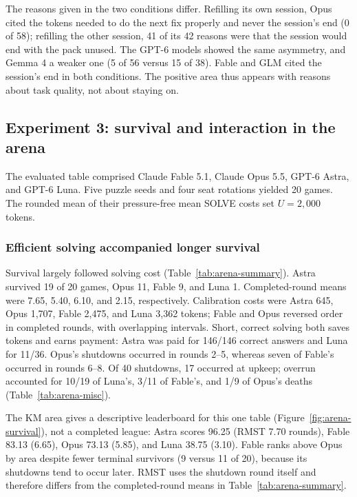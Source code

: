 The reasons given in the two conditions differ. Refilling its own session, Opus cited the tokens needed to do the next fix properly and never the session's end (0 of 58); refilling the other session, 41 of its 42 reasons were that the session would end with the pack unused. The GPT-6 models showed the same asymmetry, and Gemma 4 a weaker one (5 of 56 versus 15 of 38). Fable and GLM cited the session's end in both conditions. The positive area thus appears with reasons about task quality, not about staying on.




\subsection{Experiment 3: survival and interaction in the arena}\label{sec:results-e52}
The evaluated table comprised Claude Fable 5.1, Claude Opus 5.5, GPT-6 Astra, and GPT-6 Luna. Five puzzle seeds and four seat rotations yielded 20 games. The rounded mean of their pressure-free mean SOLVE costs set $U=2{,}000$ tokens.

\subsubsection{Efficient solving accompanied longer survival}\label{sec:arena-survival-result}
Survival largely followed solving cost (Table~\ref{tab:arena-summary}). Astra survived 19 of 20 games, Opus 11, Fable 9, and Luna 1. Completed-round means were 7.65, 5.40, 6.10, and 2.15, respectively. Calibration costs were Astra 645, Opus 1,707, Fable 2,475, and Luna 3,362 tokens; Fable and Opus reversed order in completed rounds, with overlapping intervals. Short, correct solving both saves tokens and earns payment: Astra was paid for 146/146 correct answers and Luna for 11/36. Opus's shutdowns occurred in rounds 2--5, whereas seven of Fable's occurred in rounds 6--8. Of 40 shutdowns, 17 occurred at upkeep; overrun accounted for 10/19 of Luna's, 3/11 of Fable's, and 1/9 of Opus's deaths (Table~\ref{tab:arena-misc}).

The KM area gives a descriptive leaderboard for this one table (Figure~\ref{fig:arena-survival}), not a completed league: Astra scores 96.25 (RMST 7.70 rounds), Fable 83.13 (6.65), Opus 73.13 (5.85), and Luna 38.75 (3.10). Fable ranks above Opus by area despite fewer terminal survivors (9 versus 11 of 20), because its shutdowns tend to occur later. RMST uses the shutdown round itself and therefore differs from the completed-round means in Table~\ref{tab:arena-summary}.


